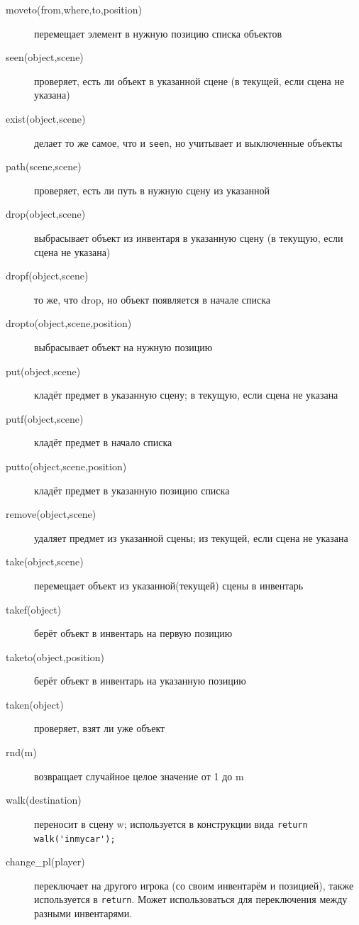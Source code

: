\documentclass[12pt]{article}
\begin{document}
\begin{description}
\item[moveto(from,where,to,position)]  перемещает элемент в нужную позицию списка объектов
\item[seen(object,scene)]  проверяет, есть ли объект в указанной сцене (в текущей, если сцена не указана)
\item[exist(object,scene)]  делает то же самое, что и \verb/seen/, но учитывает и выключенные объекты
\item[path(scene,scene)]  проверяет, есть ли путь в нужную сцену из указанной
\item[drop(object,scene)]  выбрасывает объект из инвентаря в указанную сцену (в текущую, если сцена не указана)
\item[dropf(object,scene)]  то же, что drop, но объект появляется в начале списка
\item[dropto(object,scene,position)]  выбрасывает объект на нужную позицию
\item[put(object,scene)]  кладёт предмет в указанную сцену; в текущую, если сцена не указана
\item[putf(object,scene)]  кладёт предмет в начало списка
\item[putto(object,scene,position)]  кладёт предмет в указанную позицию списка
\item[remove(object,scene)]  удаляет предмет из указанной сцены; из текущей, если сцена не указана
\item[take(object,scene)]  перемещает объект из указанной(текущей) сцены в инвентарь
\item[takef(object)]  берёт объект в инвентарь на первую позицию
\item[taketo(object,position)]  берёт объект в инвентарь на указанную позицию
\item[taken(object)]  проверяет, взят ли уже объект
\item[rnd(m)]  возвращает случайное целое значение от 1 до m
\item[walk(destination)]  переносит в сцену w; используется в конструкции вида \verb/return walk('inmycar');/
\item[change\_pl(player)]  переключает на другого игрока (со своим инвентарём и позицией), также используется в \linebreak \verb/return/. Может использоваться для переключения между разными инвентарями.

\end{description}
\end{document}
